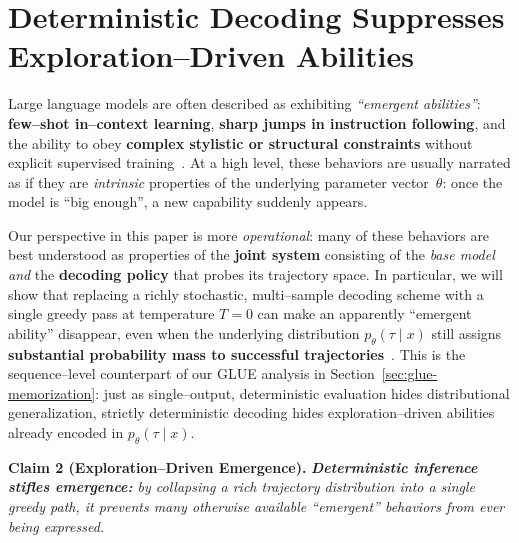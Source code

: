 





\section{Deterministic Decoding Suppresses Exploration--Driven Abilities}
\label{sec:exploration-emergence}

Large language models are often described as exhibiting \emph{``emergent abilities''}:
\textbf{few--shot in--context learning}, \textbf{sharp jumps in instruction following}, and the
ability to obey \textbf{complex stylistic or structural constraints} without explicit
supervised training~\citep{brown2020language,wei2022emergent}. At a high level,
these behaviors are usually narrated as if they are \emph{intrinsic} properties of the
underlying parameter vector~$\theta$: once the model is ``big enough'', a new capability
suddenly appears.

Our perspective in this paper is more \emph{operational}: many of these behaviors are best
understood as properties of the \textbf{joint system} consisting of the \emph{base model}
\emph{and} the \textbf{decoding policy} that probes its trajectory space. In particular, we
will show that replacing a richly stochastic, multi--sample decoding scheme with a single
greedy pass at temperature $T{=}0$ can make an apparently ``emergent ability'' disappear,
even when the underlying distribution $p_\theta(\tau \mid x)$ still assigns
\textbf{substantial probability mass to successful trajectories}~\citep{wei2022chainofthought,
wang2022selfconsistency,yao2023treeofthought,kojima2022large}. This is the sequence--level
counterpart of our GLUE analysis in Section~\ref{sec:glue-memorization}: just as
single--output, deterministic evaluation hides distributional generalization, strictly
deterministic decoding hides exploration--driven abilities already encoded in
$p_\theta(\tau\mid x)$.

\begin{tcolorbox}[colback=gray!5,colframe=black!60,sharp corners]
\textbf{Claim 2 (Exploration--Driven Emergence).}
\emph{\textbf{Deterministic inference stifles emergence:} by collapsing a rich
trajectory distribution into a single greedy path, it prevents many otherwise
available ``emergent'' behaviors from ever being expressed.}
\end{tcolorbox}


